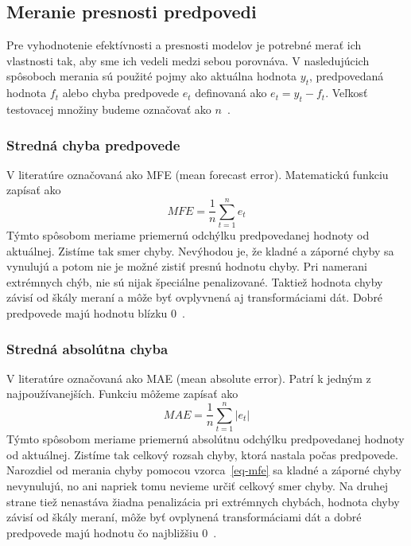 \documentclass[a4paper,slovak,12pt,appendix]{article}
\begin{document}

\subsection{Meranie presnosti predpovedi}
Pre vyhodnotenie efektívnosti a presnosti modelov je potrebné merať ich
vlastnosti tak, aby sme ich vedeli medzi sebou porovnáva. V nasledujúcich
spôsoboch merania sú použité pojmy ako aktuálna hodnota $y_t$, predpovedaná
hodnota $f_t$ alebo chyba predpovede $e_t$ definovaná ako $e_t = y_t - f_t$.
Veľkosť testovacej množiny budeme označovať ako $n$~\cite{Agrawal2013}.

\subsubsection{Stredná chyba predpovede}
V literatúre označovaná ako MFE (mean forecast error). Matematickú funkciu
zapísať ako
\begin{equation}
  MFE = \frac{1}{n} \sum_{t=1}^{n} e_t
  \label{eq-mfe}
\end{equation}
Týmto spôsobom meriame priemernú odchýlku predpovedanej hodnoty od aktuálnej.
Zistíme tak smer chyby. Nevýhodou je, že kladné a záporné chyby sa vynulujú
a potom nie je možné zistiť presnú hodnotu chyby. Pri namerani extrémnych chýb,
nie sú nijak špeciálne penalizované. Taktiež hodnota chyby závisí od škály
meraní a môže byť ovplyvnená aj transformáciami dát. Dobré predpovede majú
hodnotu blízku 0~\cite{Agrawal2013}.

\subsubsection{Stredná absolútna chyba}
V literatúre označovaná ako MAE (mean absolute error). Patrí k jedným
z najpoužívanejších. Funkciu môžeme zapísať ako
\begin{equation}
  MAE = \frac{1}{n} \sum_{t=1}^{n} |e_t|
  \label{eq-mae}
\end{equation}
Týmto spôsobom meriame priemernú absolútnu odchýlku predpovedanej hodnoty od
aktuálnej. Zistíme tak celkový rozsah chyby, ktorá nastala počas predpovede.
Narozdiel od merania chyby pomocou vzorca~\ref{eq-mfe} sa kladné a záporné
chyby nevynulujú, no ani napriek tomu nevieme určiť celkový smer chyby.
Na druhej strane tiež nenastáva žiadna penalizácia pri extrémnych chybách,
hodnota chyby závisí od škály meraní, môže byť ovplynená transformáciami dát
a dobré predpovede majú hodnotu čo
najbližšiu 0~\cite{Agrawal2013, Gutierrez2015}.
\end{document}
